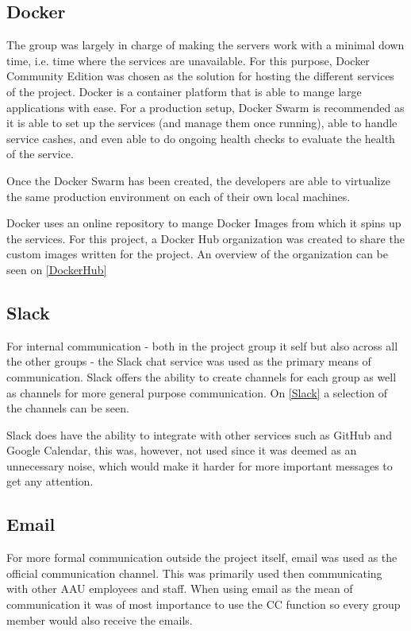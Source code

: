 

\subsection{Docker}
The group was largely in charge of making the servers work with a minimal down time, i.e. time where the services are unavailable.
For this purpose, Docker Community Edition was chosen as the solution for hosting the different services of the project. 
Docker is a container platform that is able to mange large applications with ease. 
For a production setup, Docker Swarm is recommended as it is able to set up the services (and manage them once running), able to handle service cashes, and even able to do ongoing health checks to evaluate the health of the service. 

Once the Docker Swarm has been created, the developers are able to virtualize the same production environment on each of their own local machines. 

Docker uses an online repository to mange Docker Images from which it spins up the services. 
For this project, a Docker Hub organization was created to share the custom images written for the project. 
An overview of the organization can be seen on \autoref{DockerHub}


\subsection{Slack}
For internal communication - both in the project group it self but also across all the other groups - the Slack chat service was used as the primary means of communication. 
Slack offers the ability to create channels for each group as well as channels for more general purpose communication. 
On \autoref{Slack} a selection of the channels can be seen. 


Slack does have the ability to integrate with other services such as GitHub and Google Calendar, this was, however, not used since it was deemed as an unnecessary noise, which would make it harder for more important messages to get any attention. 

\subsection{Email}
For more formal communication outside the project itself, email was used as the official communication channel. 
This was primarily used then communicating with other AAU employees and staff. 
When using email as the mean of communication it was of most importance to use the CC function so every group member would also receive the emails.
